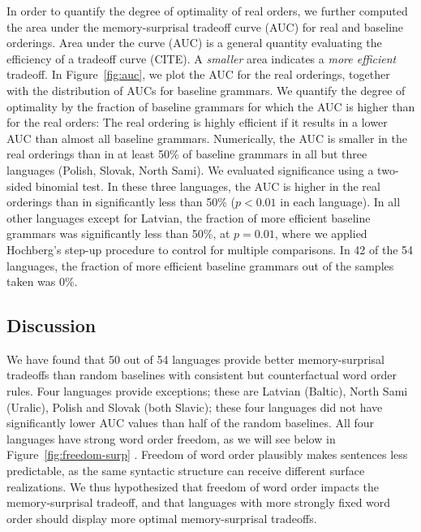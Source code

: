 In order to quantify the degree of optimality of real orders, we further computed the area under the memory-surprisal tradeoff curve (AUC) for real and baseline orderings.
Area under the curve (AUC) is a general quantity evaluating the efficiency of a tradeoff curve (CITE).
A \emph{smaller} area indicates a \emph{more efficient} tradeoff.
In Figure~\ref{fig:auc}, we plot the AUC for the real orderings, together with the distribution of AUCs for baseline grammars.
We quantify the degree of optimality by the fraction of baseline grammars for which the AUC is higher than for the real orders:
The real ordering is highly efficient if it results in a lower AUC than almost all baseline grammars.
Numerically, the AUC is smaller in the real orderings than in at least 50\% of baseline grammars in all but three languages (Polish, Slovak, North Sami).
We evaluated significance using a two-sided binomial test.
In these three languages, the AUC is higher in the real orderings than in significantly less than 50\% ($p < 0.01$ in each language).
In all other languages except for Latvian, the fraction of more efficient baseline grammars was significantly less than 50\%, at $p=0.01$, where we applied Hochberg's step-up procedure \citep{hochberg1988sharper} to control for multiple comparisons.
In 42 of the 54 languages, the fraction of more efficient baseline grammars out of the samples taken was 0\%.



\subsection{Discussion}\label{subsec:expt2-discussion}

We have found that 50 out of 54 languages provide better memory-surprisal tradeoffs than random baselines with consistent but counterfactual word order rules.
Four languages provide exceptions; these are Latvian (Baltic), North Sami (Uralic), Polish and Slovak (both Slavic); these four languages did not have significantly lower AUC values than half of the random baselines.
All four languages have strong word order freedom, as we will see below in Figure~\ref{fig:freedom-surp} .
Freedom of word order plausibly makes sentences less predictable, as the same syntactic structure can receive different surface realizations.
We thus hypothesized that freedom of word order impacts the memory-surprisal tradeoff, and that languages with more strongly fixed word order should display more optimal memory-surprisal tradeoffs.


